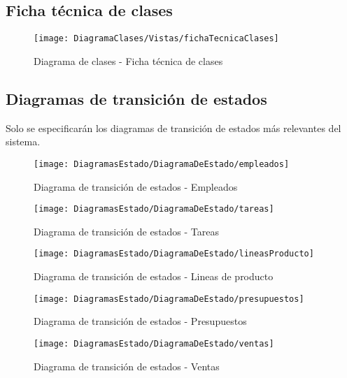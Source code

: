 	\subsection{Ficha técnica de clases}
	\begin{figure}[H]
		\centering
		\texttt{[image: DiagramaClases/Vistas/fichaTecnicaClases]}
		\caption{Diagrama de clases - Ficha técnica de clases}
	\label{fig:Modelo de clases - Ficha técnica de clases}
	\end{figure}

	

	\clearpage %
	\subsection{Diagramas de transición de estados}
	Solo se especificarán los diagramas de transición de estados más relevantes del sistema.
	\begin{figure}[H]
		\centering
		\texttt{[image: DiagramasEstado/DiagramaDeEstado/empleados]}
		\caption{Diagrama de transición de estados - Empleados}
		\label{fig:Diagrama de transición de estados - Empleados}
	\end{figure}
	\begin{figure}[H]
		\centering
		\texttt{[image: DiagramasEstado/DiagramaDeEstado/tareas]}
		\caption{Diagrama de transición de estados - Tareas}
		\label{fig:Diagrama de transición de estados - Tareas}
	\end{figure}
	\begin{figure}[H]
		\centering
		\texttt{[image: DiagramasEstado/DiagramaDeEstado/lineasProducto]}
		\caption{Diagrama de transición de estados - Lineas de producto}
		\label{fig:Diagrama de transición de estados - Lineas de producto}
	\end{figure}
	\begin{figure}[H]
		\centering
		\texttt{[image: DiagramasEstado/DiagramaDeEstado/presupuestos]}
		\caption{Diagrama de transición de estados - Presupuestos}
		\label{fig:Diagrama de transición de estados - Presupuestos}
	\end{figure}
	\begin{figure}[H]
		\centering
		\texttt{[image: DiagramasEstado/DiagramaDeEstado/ventas]}
		\caption{Diagrama de transición de estados - Ventas}
		\label{fig:Diagrama de transición de estados - Ventas}
	\end{figure}
